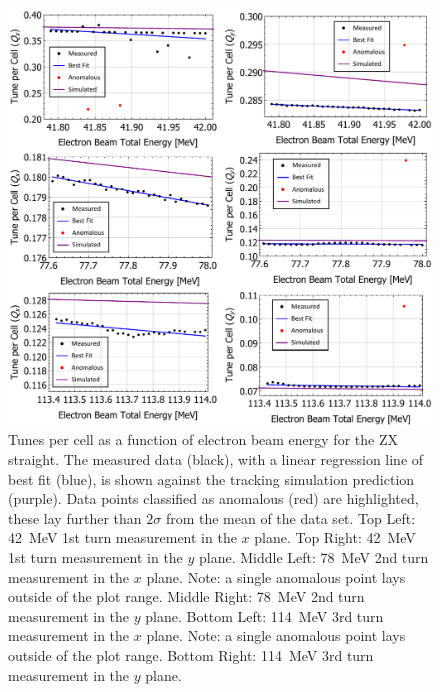\documentclass[../main.tex]{subfiles}
\begin{document}
\begin{figure}[!h]
\centering
\includegraphics[width=\textwidth]{Figures/CBETA_Multi-Pass_Commissioning/chromaticity/ZX_analysed_3turn_tunes.pdf}
\caption{Tunes per cell as a function of electron beam energy for the ZX straight. The measured data (black), with a linear regression line of best fit (blue), is shown against the tracking simulation prediction (purple). Data points classified as anomalous (red) are highlighted, these lay further than $2\sigma$ from the mean of the data set. Top Left: 42~\si{\mega\electronvolt} 1st turn measurement in the $x$ plane. Top Right: 42~\si{\mega\electronvolt} 1st turn measurement in the $y$ plane. Middle Left: 78~\si{\mega\electronvolt} 2nd turn measurement in the $x$ plane. Note: a single anomalous point lays outside of the plot range. Middle Right: 78~\si{\mega\electronvolt} 2nd turn measurement in the $y$ plane. Bottom Left: 114~\si{\mega\electronvolt} 3rd turn measurement in the $x$ plane. Note: a single anomalous point lays outside of the plot range. Bottom Right: 114~\si{\mega\electronvolt} 3rd turn measurement in the $y$ plane.}
\label{fig:ZX_analysed_tunes}
\end{figure}
\end{document}
